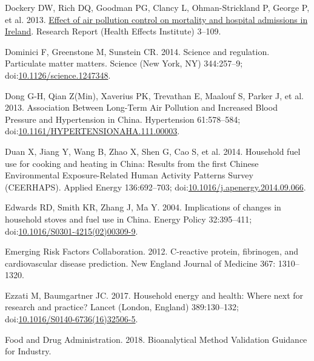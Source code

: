 \documentclass[
  letterpaper,
  DIV=11,
  numbers=noendperiod]{scrartcl}
\newlength{\cslhangindent}
\newlength{\cslentryspacingunit} %
\newenvironment{CSLReferences}[2] %
 {%
  \setlength{\parindent}{0pt}
  \ifodd #1
  \let\oldpar\par
  \def\par{\hangindent=\cslhangindent\oldpar}
  \fi
  \setlength{\parskip}{#2\cslentryspacingunit}
 }%
 {}
\begin{document}
\begin{CSLReferences}{1}{0}
\leavevmode{}%
Dockery DW, Rich DQ, Goodman PG, Clancy L, Ohman-Strickland P, George P,
et al. 2013. \href{https://www.ncbi.nlm.nih.gov/pubmed/24024358}{Effect
of air pollution control on mortality and hospital admissions in
{Ireland}}. Research Report (Health Effects Institute) 3--109.

\leavevmode{}%
Dominici F, Greenstone M, Sunstein CR. 2014. Science and regulation.
{Particulate} matter matters. Science (New York, NY) 344:257--9;
doi:\href{https://doi.org/10.1126/science.1247348}{10.1126/science.1247348}.

\leavevmode{}%
Dong G-H, Qian Z(Min), Xaverius PK, Trevathan E, Maalouf S, Parker J, et
al. 2013. Association {Between Long-Term Air Pollution} and {Increased
Blood Pressure} and {Hypertension} in {China}. Hypertension 61:578--584;
doi:\href{https://doi.org/10.1161/HYPERTENSIONAHA.111.00003}{10.1161/HYPERTENSIONAHA.111.00003}.

\leavevmode{}%
Duan X, Jiang Y, Wang B, Zhao X, Shen G, Cao S, et al. 2014. Household
fuel use for cooking and heating in {China}: {Results} from the first
{Chinese Environmental Exposure-Related Human Activity Patterns Survey}
({CEERHAPS}). Applied Energy 136:692--703;
doi:\href{https://doi.org/10.1016/j.apenergy.2014.09.066}{10.1016/j.apenergy.2014.09.066}.

\leavevmode{}%
Edwards RD, Smith KR, Zhang J, Ma Y. 2004. Implications of changes in
household stoves and fuel use in {China}. Energy Policy 32:395--411;
doi:\href{https://doi.org/10.1016/S0301-4215(02)00309-9}{10.1016/S0301-4215(02)00309-9}.

\leavevmode{}%
Emerging Risk Factors Collaboration. 2012. C-reactive protein,
fibrinogen, and cardiovascular disease prediction. New England Journal
of Medicine 367: 1310--1320.

\leavevmode{}%
Ezzati M, Baumgartner JC. 2017. Household energy and health: Where next
for research and practice? Lancet (London, England) 389:130--132;
doi:\href{https://doi.org/10.1016/S0140-6736(16)32506-5}{10.1016/S0140-6736(16)32506-5}.

\leavevmode{}%
Food and Drug Administration. 2018. Bioanalytical {Method Validation
Guidance} for {Industry}.


\end{CSLReferences}
\end{document}
